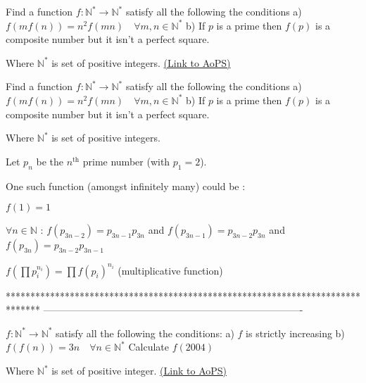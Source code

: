 \begin{problem}
	Find a function $f: \mathbb{N}^*\to\mathbb{N}^*$ satisfy all the following the conditions
a) $f(mf(n))=n^{2}f(mn)\quad \forall m,n\in\mathbb{N}^*$
b) If $p$ is a prime then $f(p)$ is a composite number but  it isn't a perfect square.

Where $\mathbb{N}^*$ is set of positive integers.
	\flushright \href{https://artofproblemsolving.com/community/c6h569383}{(Link to AoPS)}
\end{problem}



\begin{solution}
	\begin{tcolorbox}Find a function $f: \mathbb{N}^*\to\mathbb{N}^*$ satisfy all the following the conditions
a) $f(mf(n))=n^{2}f(mn)\quad \forall m,n\in\mathbb{N}^*$
b) If $p$ is a prime then $f(p)$ is a composite number but  it isn't a perfect square.

Where $\mathbb{N}^*$ is set of positive integers.\end{tcolorbox}
Let $p_n$ be the $n^{\text{th}}$ prime number (with $p_1=2$).

One such function (amongst infinitely many) could be :

$f(1)=1$

$\forall n\in\mathbb N$ :  $f(p_{3n-2})=p_{3n-1}p_{3n}$ and $f(p_{3n-1})=p_{3n-2}p_{3n}$ and $f(p_{3n})=p_{3n-2}p_{3n-1}$

$f(\prod p_i^{n_i})=\prod f(p_i)^{n_i}$ (multiplicative function)
\end{solution}
*******************************************************************************
-------------------------------------------------------------------------------

\begin{problem}
	$f: \mathbb{N}^*\to\mathbb{N}^*$ satisfy all the following the conditions:
a) $f$ is strictly increasing
b) $f(f(n))=3n \quad \forall n\in\mathbb{N}^*$
Calculate $f(2004)$

Where $\mathbb{N}^*$ is set of positive integer.
	\flushright \href{https://artofproblemsolving.com/community/c6h569384}{(Link to AoPS)}
\end{problem}



